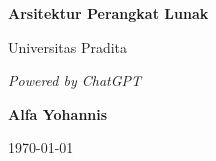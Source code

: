 \documentclass[11pt]{book}
\begin{document}
	
	\begin{titlepage}
		\centering
		\vspace*{1cm}
		
		\Huge
		\textbf{Arsitektur Perangkat Lunak}
		
		\vspace{0.5cm}
		
		\LARGE
		Universitas Pradita
		
		\vspace{1.5cm}
		
		\textit{Powered by ChatGPT}
		
		\vspace{2cm}
		
		\textbf{Alfa Yohannis}
		
		\vspace{0.8cm}
		
		\today
		
		\vfill
	\end{titlepage}
	
	\tableofcontents
	













\backmatter
{}
%

\end{document}
